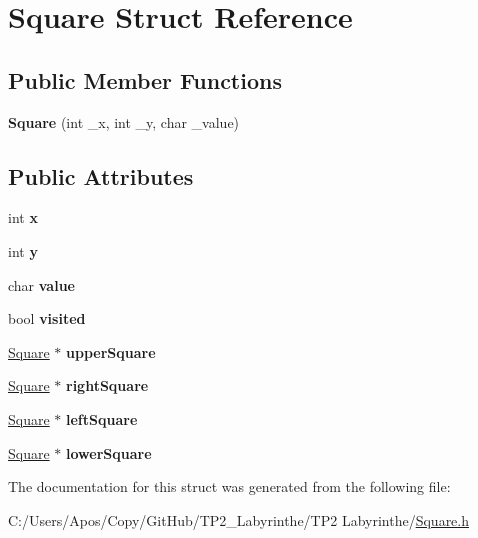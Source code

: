 \hypertarget{struct_square}{\section{Square Struct Reference}
\label{struct_square}
}
\subsection*{Public Member Functions}
\begin{DoxyCompactItemize}
\item 
\hypertarget{struct_square_a2db539b65d3bd1f6572157924e52c057}{{\bfseries Square} (int \-\_\-x, int \-\_\-y, char \-\_\-value)}\label{struct_square_a2db539b65d3bd1f6572157924e52c057}

\end{DoxyCompactItemize}
\subsection*{Public Attributes}
\begin{DoxyCompactItemize}
\item 
\hypertarget{struct_square_a2d73bbd2e669a20d454f811692a288ee}{int {\bfseries x}}\label{struct_square_a2d73bbd2e669a20d454f811692a288ee}

\item 
\hypertarget{struct_square_a41d0d952cce582e7258a3b0b10aeeb08}{int {\bfseries y}}\label{struct_square_a41d0d952cce582e7258a3b0b10aeeb08}

\item 
\hypertarget{struct_square_ace5857d2ca6997bf08a493cadd7aed12}{char {\bfseries value}}\label{struct_square_ace5857d2ca6997bf08a493cadd7aed12}

\item 
\hypertarget{struct_square_a1da498e9a952f460dc960d12ee698585}{bool {\bfseries visited}}\label{struct_square_a1da498e9a952f460dc960d12ee698585}

\item 
\hypertarget{struct_square_af5e0dd1b5f443048e3eca21854a6423d}{\hyperlink{struct_square}{Square} $\ast$ {\bfseries upper\-Square}}\label{struct_square_af5e0dd1b5f443048e3eca21854a6423d}

\item 
\hypertarget{struct_square_aedce51a27f09698060ba1af3898a4dfb}{\hyperlink{struct_square}{Square} $\ast$ {\bfseries right\-Square}}\label{struct_square_aedce51a27f09698060ba1af3898a4dfb}

\item 
\hypertarget{struct_square_a3c2194240d412452285945b3fb9b4ab5}{\hyperlink{struct_square}{Square} $\ast$ {\bfseries left\-Square}}\label{struct_square_a3c2194240d412452285945b3fb9b4ab5}

\item 
\hypertarget{struct_square_a92400b77903a53f511d2cb1bc5e99379}{\hyperlink{struct_square}{Square} $\ast$ {\bfseries lower\-Square}}\label{struct_square_a92400b77903a53f511d2cb1bc5e99379}

\end{DoxyCompactItemize}


The documentation for this struct was generated from the following file\-:\begin{DoxyCompactItemize}
\item 
C\-:/\-Users/\-Apos/\-Copy/\-Git\-Hub/\-T\-P2\-\_\-\-Labyrinthe/\-T\-P2 Labyrinthe/\hyperlink{_square_8h}{Square.\-h}\end{DoxyCompactItemize}
